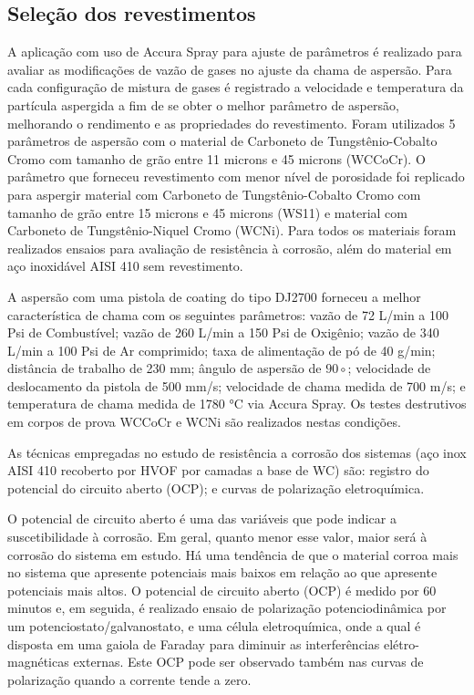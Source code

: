 \subsection{Seleção dos revestimentos}

A aplicação com uso de Accura Spray para ajuste de parâmetros é
realizado para avaliar as modificações de vazão de gases no ajuste da
chama de aspersão. Para cada configuração de mistura de gases é registrado a
velocidade e temperatura da partícula aspergida a fim de se obter o melhor
parâmetro de aspersão, melhorando o rendimento e as propriedades do
revestimento. Foram utilizados 5 parâmetros de aspersão com o material de
Carboneto de Tungstênio-Cobalto Cromo com tamanho de grão entre 11 microns e 45 microns
(WCCoCr). O parâmetro que forneceu revestimento com menor nível de porosidade
foi replicado para aspergir material com Carboneto de Tungstênio-Cobalto Cromo
com tamanho de grão entre 15 microns e 45 microns (WS11) e material com
Carboneto de Tungstênio-Niquel Cromo (WCNi). Para todos os materiais foram
realizados ensaios para avaliação de resistência à corrosão, além do material
em aço inoxidável AISI 410 sem revestimento.

A aspersão com uma pistola de coating do tipo DJ2700 forneceu a
melhor característica de chama com os seguintes parâmetros: vazão de 72 L/min a
100 Psi de Combustível; vazão de 260 L/min a 150 Psi de Oxigênio; vazão de 340
L/min a 100 Psi de Ar comprimido; taxa de alimentação de pó de 40 g/min;
distância de trabalho de 230 mm; ângulo de aspersão de $90\circ$; velocidade de
deslocamento da pistola de 500 mm/s; velocidade de chama medida de 700 m/s; e
temperatura de chama medida de 1780 °C via Accura Spray. Os testes destrutivos
em corpos de prova WCCoCr e WCNi são realizados nestas condições.

As técnicas empregadas no estudo de resistência a corrosão dos sistemas (aço
inox AISI 410 recoberto por HVOF por camadas a base de WC) são: registro do
potencial do circuito aberto (OCP); e curvas de polarização eletroquímica. 

O potencial de circuito aberto é uma das variáveis que pode indicar a
suscetibilidade à corrosão. Em geral, quanto menor esse valor, maior será à
corrosão do sistema em estudo. Há uma tendência de que o material corroa mais no
sistema que apresente potenciais mais baixos em relação ao que apresente
potenciais mais altos. O potencial de circuito aberto (OCP) é medido por 60
minutos e, em seguida, é realizado ensaio de polarização potenciodinâmica
por um potenciostato/galvanostato, e uma célula eletroquímica,
onde a qual é disposta em uma gaiola de Faraday para diminuir as interferências
elétro-magnéticas externas. Este OCP pode ser observado também nas curvas
de polarização quando a corrente tende a zero.

